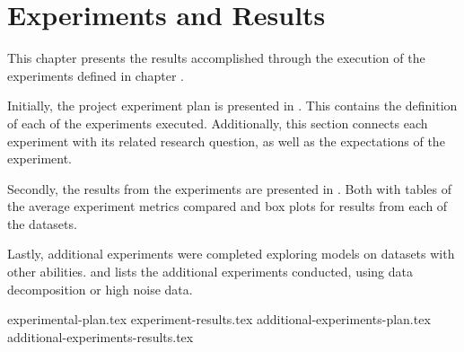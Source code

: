 \chapter{Experiments and Results}
\label{section:Results}

This chapter presents the results accomplished through the execution of the experiments defined in chapter .

Initially, the project experiment plan is presented in .
This contains the definition of each of the experiments executed.
Additionally, this section connects each experiment with its related research question,
as well as the expectations of the experiment.

Secondly, the results from the experiments are presented in .
Both with tables of the average experiment metrics compared and box plots for results from each of the datasets.

Lastly, additional experiments were completed exploring models on datasets with other abilities.
 and 
lists the additional experiments conducted, using data decomposition or high noise data.


{experimental-plan.tex}
{experiment-results.tex}
{additional-experiments-plan.tex}
{additional-experiments-results.tex}




\iffalse

  \section{Experimental Setup}
  \label{sec:experimentalSetup}

  The experimental setup should include all data - parameters etc, that would allow a person to repeat your experiments.

  \section{Experimental Results}
  \label{sec:experimentalResults}

  Results should be clearly displayed and should provide a suitable representation of your results for the points you wish to make. Graphs should be labeled in a legible font and if more than one result is displayed on the same graph then these should be clearly marked.   Please choose carefully rather than presenting every results. Too much information is hard to read and often hides the key information you wish to present. Make use of statistical methods when presenting results, where possible to strengthen the results.  Further, the format of the presentation of results should be chosen based on what issues in the results you wish to highlight. You may wish to present a subset in the experimental section and provide additional results in the appendix.
\fi